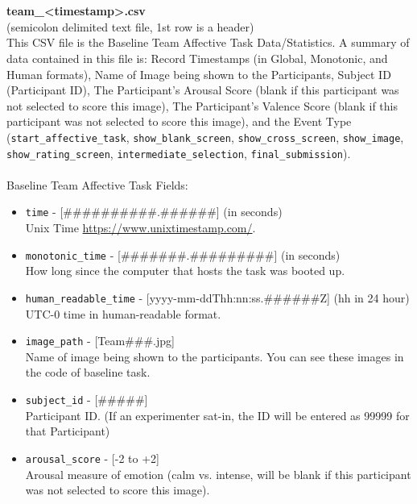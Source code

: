 \begin{description}
\begin{addmargin}[0em]{0em}
        \textbf{\\\\}
        \begin{addmargin}[1em]{0em} %
            \label{team_<timestamp>.csv}
            \textbf{team\_<timestamp>.csv}\\(semicolon delimited text file, 1st row is a header)\\
            This CSV file is the Baseline Team Affective Task Data/Statistics. A summary of data contained in this file is: Record Timestamps (in Global, Monotonic, and Human formats), Name of Image being shown to the Participants, Subject ID (Participant ID), The Participant's Arousal Score (blank if this participant was not selected to score this image), The Participant's Valence Score (blank if this participant was not selected to score this image), and the Event Type
            (\verb|start_affective_task|, \verb|show_blank_screen|,
            \verb|show_cross_screen|, \verb|show_image|, \verb|show_rating_screen|,
            \verb|intermediate_selection|, \verb|final_submission|).\\\\
            Baseline Team Affective Task Fields:
            \begin{itemize}
                \item \verb|time| - [\#\#\#\#\#\#\#\#\#\#.\#\#\#\#\#\#] (in seconds)\\Unix Time \href{https://www.unixtimestamp.com/}{https://www.unixtimestamp.com/}.
                \item \verb|monotonic_time| - [\#\#\#\#\#\#\#.\#\#\#\#\#\#\#\#\#] (in seconds)\\How long since the computer that hosts the task was booted up.
                \item \verb|human_readable_time| - [yyyy-mm-ddThh:nn:ss.\#\#\#\#\#\#Z] (hh in 24 hour)\\ UTC-0 time in human-readable format.
                \item \verb|image_path| - [Team\#\#\#.jpg]\\Name of image being shown to the participants. You can see these images in the code of baseline task.
                \item \verb|subject_id| - [\#\#\#\#\#]\\Participant ID. (If an experimenter sat-in, the ID will be entered as 99999 for that Participant)
                \item \verb|arousal_score| - [-2 to +2]\\Arousal measure of emotion (calm vs. intense, will be blank if this participant was not selected to score this image).

\end{itemize}
\end{addmargin}
\end{addmargin}
\end{description}
